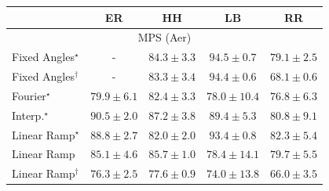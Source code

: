 \begin{tabular}{l|cccc|}
\toprule
            & ER & HH & LB & RR \\
\midrule
\multicolumn{5}{c}{\rule{0pt}{8pt}MPS (Aer)} \\
\midrule
Fixed Angles$^\star$ & {\cellcolor[HTML]{000000}} \color[HTML]{F1F1F1} {\cellcolor{white}} \color{black} - & {\cellcolor[HTML]{8C6AB1}} \color[HTML]{F1F1F1} $84.3\pm 3.3$ & {\cellcolor[HTML]{570354}} \color[HTML]{F1F1F1} $94.5\pm 0.7$ & {\cellcolor[HTML]{93A5CE}} \color[HTML]{F1F1F1} $79.1\pm 2.5$ \\
Fixed Angles$^\dagger$ & {\cellcolor[HTML]{000000}} \color[HTML]{F1F1F1} {\cellcolor{white}} \color{black} - & {\cellcolor[HTML]{8C76B7}} \color[HTML]{F1F1F1} $83.3\pm 3.4$ & {\cellcolor[HTML]{580356}} \color[HTML]{F1F1F1} $94.4\pm 0.6$ & {\cellcolor[HTML]{E9F2F8}} \color[HTML]{000000} $68.1\pm 0.6$ \\
Fourier$^\star$ & {\cellcolor[HTML]{8F9DC9}} \color[HTML]{F1F1F1} $79.9\pm 6.1$ & {\cellcolor[HTML]{8C80BB}} \color[HTML]{F1F1F1} $82.4\pm 3.3$ & {\cellcolor[HTML]{99B1D4}} \color[HTML]{000000} $78.0\pm 10.4$ & {\cellcolor[HTML]{9FBCDA}} \color[HTML]{000000} $76.8\pm 6.3$ \\
Interp.$^\star$ & {\cellcolor[HTML]{831D85}} \color[HTML]{F1F1F1} $90.5\pm 2.0$ & {\cellcolor[HTML]{8949A1}} \color[HTML]{F1F1F1} $87.2\pm 3.8$ & {\cellcolor[HTML]{852D90}} \color[HTML]{F1F1F1} $89.4\pm 5.3$ & {\cellcolor[HTML]{8C93C4}} \color[HTML]{F1F1F1} $80.8\pm 9.1$ \\
Linear Ramp$^\star$ & {\cellcolor[HTML]{863595}} \color[HTML]{F1F1F1} $88.8\pm 2.7$ & {\cellcolor[HTML]{8C85BE}} \color[HTML]{F1F1F1} $82.0\pm 2.0$ & {\cellcolor[HTML]{670864}} \color[HTML]{F1F1F1} $93.4\pm 0.8$ & {\cellcolor[HTML]{8C81BC}} \color[HTML]{F1F1F1} $82.3\pm 5.4$ \\
Linear Ramp & {\cellcolor[HTML]{8B61AC}} \color[HTML]{F1F1F1} $85.1\pm 4.6$ & {\cellcolor[HTML]{8A5AA9}} \color[HTML]{F1F1F1} $85.7\pm 1.0$ & {\cellcolor[HTML]{96ACD2}} \color[HTML]{F1F1F1} $78.4\pm 14.1$ & {\cellcolor[HTML]{909FCB}} \color[HTML]{F1F1F1} $79.7\pm 5.5$ \\
Linear Ramp$^\dagger$ & {\cellcolor[HTML]{A3BFDC}} \color[HTML]{000000} $76.3\pm 2.5$ & {\cellcolor[HTML]{9AB4D6}} \color[HTML]{000000} $77.6\pm 0.9$ & {\cellcolor[HTML]{B7CEE3}} \color[HTML]{000000} $74.0\pm 13.8$ & {\cellcolor[HTML]{F6FBFD}} \color[HTML]{000000} $66.0\pm 3.5$ \\

\end{tabular}
